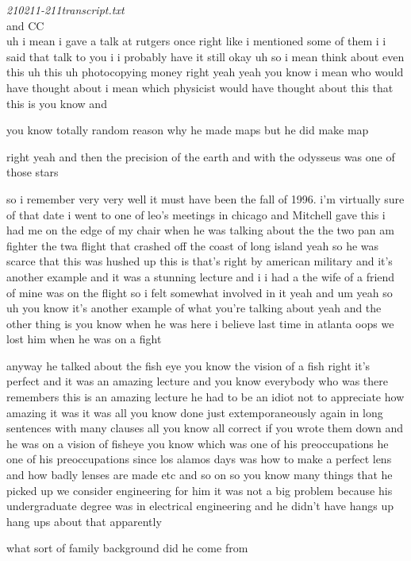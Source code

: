 \begin{description}
\emph{210211-211transcript.txt}\\
and
 {CC}\\

uh i mean i gave a talk at rutgers once right like i mentioned some of
them i i said that talk to you i i probably have it still okay uh so i
mean think about even this uh this uh photocopying money right yeah yeah
you know i mean who would have thought about i mean which physicist would
have thought about this that this is you know and

you know totally random
reason why he made maps but he did make map

right yeah and then the
precision of the earth and with the odysseus was one of those stars

so i remember very very well it must have been the fall of 1996. i'm
virtually sure of that date i went to one of leo's meetings in chicago
and Mitchell gave this i had me on the edge of my chair when he was
talking about the the two pan am fighter the twa flight that crashed off
the coast of long island yeah so he was scarce that this was hushed up
this is that's right by american military and it's another example and it
was a stunning lecture and i i had a the wife of a friend of mine was on
the flight so i felt somewhat involved in it yeah and um yeah so uh you
know it's another example of what you're talking about yeah and the other
thing is you know when he was here i believe last time in atlanta oops we
lost him when he was on a fight

anyway he talked about the fish eye you know the vision of a fish right
it's perfect and it was an amazing lecture and you know everybody who was
there remembers this is an amazing lecture he had to be an idiot not to
appreciate how amazing it was it was all you know done just
extemporaneously again in long sentences with many clauses all you know
all correct if you wrote them down and he was on a vision of fisheye you
know which was one of his preoccupations he one of his preoccupations
since los alamos days was how to make a perfect lens and how badly lenses
are made etc and so on so you know many things that he picked up we
consider engineering for him it was not a big problem because his
undergraduate degree was in electrical engineering and he didn't have
hangs up hang ups about that apparently

what sort of family background did he come from


\end{description}
